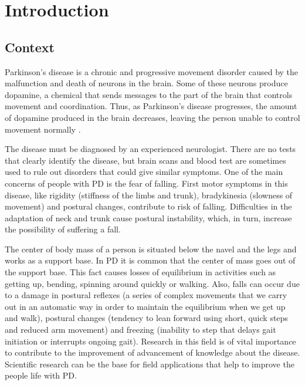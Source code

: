 
\chapter{Introduction}
\label{ch:Introduction}

\section{Context}
Parkinson’s disease is a chronic and progressive movement disorder caused by the malfunction and death of neurons in the brain. Some of these neurons produce dopamine, a chemical that sends messages to the part of the brain that controls movement and coordination. Thus, as Parkinson’s disease progresses,  the amount of dopamine produced in the brain decreases, leaving the person unable to control movement normally \cite{pdf}.

The disease must be diagnosed by an experienced neurologist. There are no tests that clearly identify the disease, but brain scans and blood test are sometimes used to rule out disorders that could give similar symptoms. 
One of the main concerns of people with PD is the fear of falling. First motor symptoms in this disease, like rigidity (stiffness  of the limbs and trunk), bradykinesia (slowness of movement) and postural changes, contribute to  risk of falling. Difficulties in the adaptation of neck and trunk cause  postural instability, which, in turn, increase the possibility of suffering a fall.

The center of body mass of a person is situated below the navel and the legs and works as a support base. In PD it is common that the center of  mass goes out of the support base. This fact causes losses of equilibrium in activities such as getting up, bending, spinning  around quickly or walking. Also, falls can occur due to a damage in postural reflexes (a series of complex movements that we carry out in an automatic way in order to maintain the equilibrium when we get up and walk), postural changes (tendency to lean forward using short, quick steps and reduced arm movement) and freezing (inability to step that delays gait initiation or interrupts ongoing gait). Research in this field is of vital importance to contribute to the improvement of advancement of knowledge about the disease. Scientific research can be the base for  field applications that help to improve the people life with PD\cite{ParkinsonDisease}\cite{pdf}. 

